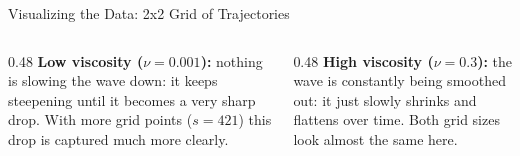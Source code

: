 \begin{frame}{\Large Visualizing the Data: 2x2 Grid of Trajectories}
  \vspace{0.3em}

\begin{columns}[t]
    \begin{column}{0.48\textwidth}
      \small \textbf{Low viscosity ($\nu=0.001$):} nothing is
      slowing the wave down: it keeps steepening until it
      becomes a very sharp drop. With more grid points ($s=421$)
      this drop is captured much more clearly.
    \end{column}
    \begin{column}{0.48\textwidth}
      \small \textbf{High viscosity ($\nu=0.3$):} the wave is
      constantly being smoothed out: it just slowly shrinks
      and flattens over time. Both grid sizes look almost
      the same here.
    \end{column}
  \end{columns}

\end{frame}

